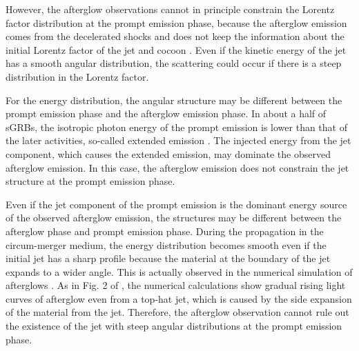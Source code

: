 \documentclass{emulateapj}
\begin{document}
However, the afterglow observations cannot in principle constrain the Lorentz factor distribution
at the prompt emission phase, because the afterglow emission comes from the decelerated shocks and
does not keep the information about the initial Lorentz factor of the jet and cocoon  
\citep[e.g., ][]{1997ApJ...489L..37S}. 
Even if the kinetic energy of the jet has a smooth angular distribution, 
the scattering could occur if there is a steep distribution in the Lorentz factor. 

For the energy distribution,
the angular structure may be different between the prompt emission phase and the afterglow emission phase.
In about a half of sGRBs, the isotropic photon energy of the prompt emission is lower than that of the later activities,
so-called extended emission \citep{2017ApJ...846..142K}.
The injected energy from the jet component, which causes the extended emission, may dominate the observed afterglow emission. 
In this case, the afterglow emission does not constrain the jet structure at the prompt emission phase.

Even if the jet component of the prompt emission is the dominant energy source of the observed afterglow emission,
the structures may be different between the afterglow phase and prompt emission phase. 
During the propagation in the circum-merger medium, the energy distribution becomes smooth even if the initial jet
has a sharp profile because the material at the boundary of the jet expands to a wider angle.
This is actually observed in the numerical simulation of afterglows 
\citep{2001grba.conf..312G}. 
As in Fig. 2 of \citet{2002ApJ...570L..61G}, the numerical calculations show gradual rising light curves of afterglow
even from a top-hat jet, which is caused by the side expansion of the material from the jet.  
Therefore, the afterglow observation cannot rule out the existence of
the jet with steep angular distributions at the prompt emission phase.
\end{document}
